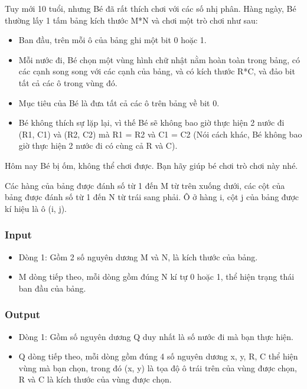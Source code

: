 



   Tuy mới 10 tuổi, nhưng Bé đã rất thích chơi với các số nhị phân. Hàng ngày, Bé thường lấy 1 tấm bảng kích thước M*N và chơi một trò chơi như sau:  
\begin{itemize}
	\item     Ban đầu, trên mỗi ô của bảng ghi một bit 0 hoặc 1.   
	\item     Mỗi nước đi, Bé chọn một vùng hình chữ nhật nằm hoàn toàn trong bảng, có các cạnh song song với các cạnh của bảng, và có kích thước R*C, và đảo bit tất cả các ô trong vùng đó.   
	\item     Mục tiêu của Bé là đưa tất cả các ô trên bảng về bit 0.   
	\item     Bé không thích sự lặp lại, vì thế Bé sẽ không bao giờ thực hiện 2 nước đi (R1, C1) và (R2, C2) mà R1 = R2 và C1 = C2 (Nói cách khác, Bé không bao giờ thực hiện 2 nước đi có cùng cả R và C).   
\end{itemize}

   Hôm nay Bé bị ốm, không thể chơi được. Bạn hãy giúp bé chơi trò chơi này nhé.  

   Các hàng của bảng được đánh số từ 1 đến M từ trên xuống dưới, các cột của bảng được đánh số từ 1 đến N từ trái sang phải. Ô ở hàng i, cột j của bảng được kí hiệu là ô (i, j).  

\subsubsection{   Input  }
\begin{itemize}
	\item     Dòng 1: Gồm 2 số nguyên dương M và N, là kích thước của bảng.   
	\item     M dòng tiếp theo, mỗi dòng gồm đúng N kí tự 0 hoặc 1, thể hiện trạng thái ban đầu của bảng.   
\end{itemize}

\subsubsection{   Output  }
\begin{itemize}
	\item     Dòng 1: Gồm số nguyên dương Q duy nhất là số nước đi mà bạn thực hiện.   
	\item     Q dòng tiếp theo, mỗi dòng gồm đúng 4 số nguyên dương x, y, R, C thể hiện vùng mà bạn chọn, trong đó (x, y) là tọa độ ô trái trên của vùng được chọn, R và C là kích thước của vùng được chọn.   
\end{itemize}

